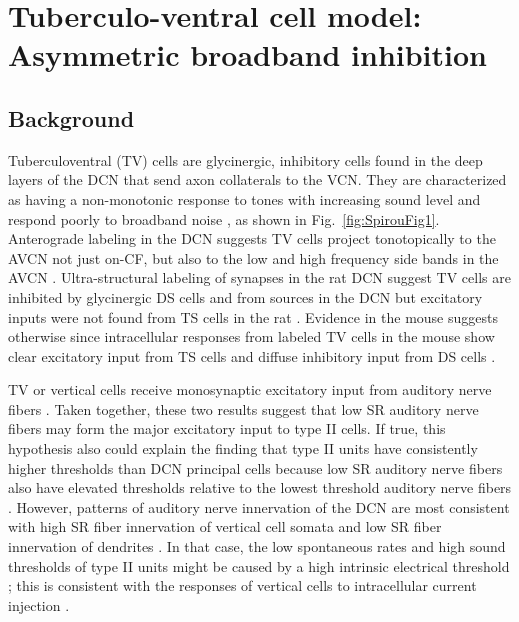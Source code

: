 
\graphicspath{{./gfx/}{../figures/}{/media/data/Work/cnstellate/TV_notch/}{/media/data/Work/Responses/}{/media/data/Work/cnstellate/}{/media/data/Work/thesis/ans2010/gfx/}}
\newpage
\section[TV Cell Model]{Tuberculo-ventral cell model: Asymmetric broadband inhibition }
\label{sec:TV-cell-model}

\subsection{Background}

Tuberculoventral (TV) cells are glycinergic, inhibitory cells found in
the deep layers of the DCN that send axon collaterals to the
VCN\@. They are characterized as having a non-monotonic response to
tones with increasing sound level and respond poorly to broadband
noise \citep{SpirouDavisEtAl:1999,NelkenYoung:1997,ReissYoung:2005},
as shown in Fig.~\ref{fig:SpirouFig1}.  Anterograde labeling in the
DCN suggests TV cells project tonotopically to the AVCN not just
on-CF, but also to the low and high frequency side bands in the AVCN
\citep{MunirathinamOstapoffEtAl:2004,OstapoffMorestEtAl:1999}.
Ultra-structural labeling of synapses in the rat DCN suggest TV cells
are inhibited by glycinergic DS cells and from sources in the DCN but
excitatory inputs were not found from TS cells in the rat
\citep{Rubio:2005}. Evidence in the mouse suggests otherwise since
intracellular responses from labeled TV cells in the mouse show clear
excitatory input from TS cells and diffuse inhibitory input from DS
cells \citep{ZhangOertel:1993b,WickesbergOertel:1993}.

\medskip{} 

TV or vertical cells receive monosynaptic excitatory input from
auditory nerve ﬁbers
\citep{OertelWu:1989}\citep{ZhangOertel:1993b}. Taken together, these
two results suggest that low SR auditory nerve ﬁbers may form the
major excitatory input to type II cells. If true, this hypothesis also
could explain the ﬁnding that type II units have consistently higher
thresholds than DCN principal cells \citep{YoungBrownell:1976} because
low SR auditory nerve ﬁbers also have elevated thresholds relative to
the lowest threshold auditory nerve ﬁbers
\citep{Liberman:1978}. However, patterns of auditory nerve innervation
of the DCN are most consistent with high SR ﬁber innervation of
vertical cell somata and low SR ﬁber innervation of dendrites
\citep{Liberman:1993}. In that case, the low spontaneous rates and
high sound thresholds of type II units might be caused by a high
intrinsic electrical threshold \citep{HancockDavisEtAl:1997}; this is
consistent with the responses of vertical cells to intracellular
current injection \citep{DingVoigt:1997,ZhangOertel:1993b}.


